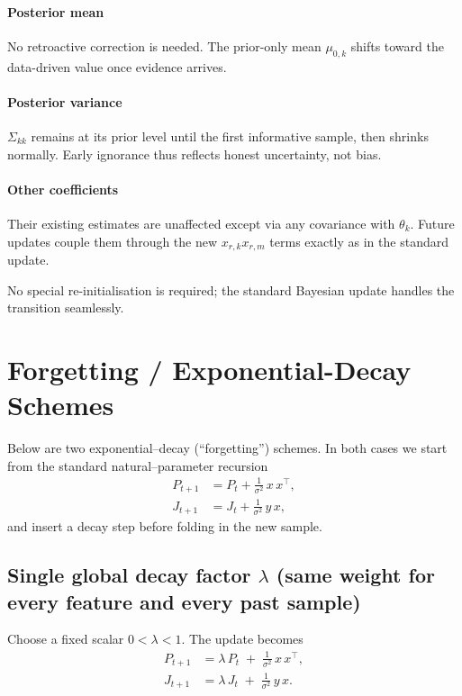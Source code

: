\documentclass[11pt]{article}
\begin{document}
\paragraph{Posterior mean}  
No retroactive correction is needed. The prior-only mean $\mu_{0,k}$ shifts toward the data-driven value once evidence arrives.

\paragraph{Posterior variance}  
$\Sigma_{kk}$ remains at its prior level until the first informative sample, then shrinks normally. Early ignorance thus reflects honest uncertainty, not bias.

\paragraph{Other coefficients}  
Their existing estimates are unaffected except via any covariance with $\theta_k$. Future updates couple them through the new $x_{r,k}x_{r,m}$ terms exactly as in the standard update.

No special re-initialisation is required; the standard Bayesian update handles the transition seamlessly.


\section{Forgetting / Exponential-Decay Schemes}

Below are two exponential–decay (``forgetting'') schemes.  In both cases we start from the standard natural–parameter recursion
\begin{align}
P_{t+1} &= P_t + \frac{1}{\sigma^2}\,x\,x^\top, 
\label{eq:std-P-update}\\
J_{t+1} &= J_t + \frac{1}{\sigma^2}\,y\,x,
\label{eq:std-J-update}
\end{align}
and insert a decay step before folding in the new sample.

\subsection{Single global decay factor \(\lambda\) (same weight for every feature and every past sample)}

Choose a fixed scalar \(0<\lambda<1\).  The update becomes
\begin{equation}\label{eq:global-decay}
\begin{split}
P_{t+1} &= \lambda\,P_t \;+\;\frac{1}{\sigma^2}\,x\,x^\top,\\
J_{t+1} &= \lambda\,J_t \;+\;\frac{1}{\sigma^2}\,y\,x.
\end{split}
\tag{5.1}
\end{equation}
\end{document}
